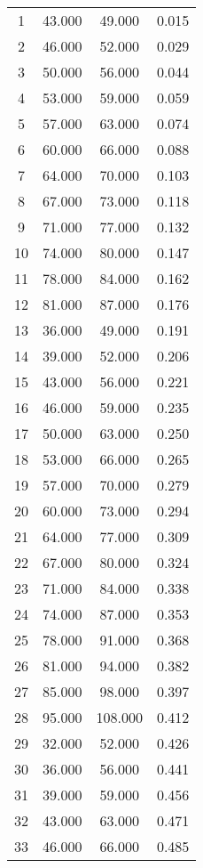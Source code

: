 % 
\begin{tabular}{cccc}
  \hline
  \hline
1 & 43.000 & 49.000 & 0.015 \\ 
  2 & 46.000 & 52.000 & 0.029 \\ 
  3 & 50.000 & 56.000 & 0.044 \\ 
  4 & 53.000 & 59.000 & 0.059 \\ 
  5 & 57.000 & 63.000 & 0.074 \\ 
  6 & 60.000 & 66.000 & 0.088 \\ 
  7 & 64.000 & 70.000 & 0.103 \\ 
  8 & 67.000 & 73.000 & 0.118 \\ 
  9 & 71.000 & 77.000 & 0.132 \\ 
  10 & 74.000 & 80.000 & 0.147 \\ 
  11 & 78.000 & 84.000 & 0.162 \\ 
  12 & 81.000 & 87.000 & 0.176 \\ 
  13 & 36.000 & 49.000 & 0.191 \\ 
  14 & 39.000 & 52.000 & 0.206 \\ 
  15 & 43.000 & 56.000 & 0.221 \\ 
  16 & 46.000 & 59.000 & 0.235 \\ 
  17 & 50.000 & 63.000 & 0.250 \\ 
  18 & 53.000 & 66.000 & 0.265 \\ 
  19 & 57.000 & 70.000 & 0.279 \\ 
  20 & 60.000 & 73.000 & 0.294 \\ 
  21 & 64.000 & 77.000 & 0.309 \\ 
  22 & 67.000 & 80.000 & 0.324 \\ 
  23 & 71.000 & 84.000 & 0.338 \\ 
  24 & 74.000 & 87.000 & 0.353 \\ 
  25 & 78.000 & 91.000 & 0.368 \\ 
  26 & 81.000 & 94.000 & 0.382 \\ 
  27 & 85.000 & 98.000 & 0.397 \\ 
  28 & 95.000 & 108.000 & 0.412 \\ 
  29 & 32.000 & 52.000 & 0.426 \\ 
  30 & 36.000 & 56.000 & 0.441 \\ 
  31 & 39.000 & 59.000 & 0.456 \\ 
  32 & 43.000 & 63.000 & 0.471 \\ 
  33 & 46.000 & 66.000 & 0.485 \\ 

\end{tabular}
